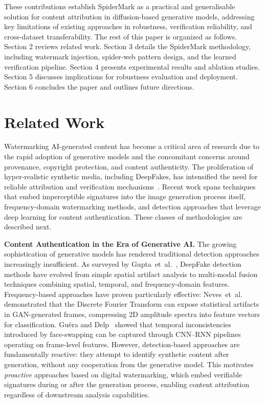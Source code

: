 \documentclass[lettersize,journal,review]{IEEEtran}
\begin{document}
These contributions establish SpiderMark as a practical and generalisable solution for content attribution in diffusion-based generative models, addressing key limitations of existing approaches in robustness, verification reliability, and cross-dataset transferability. The rest of this paper is organized as follows. Section 2 reviews related work. Section 3 details the SpiderMark methodology, including watermark injection, spider-web pattern design, and the learned verification pipeline. Section 4 presents experimental results and ablation studies. Section 5 discusses implications for robustness evaluation and deployment. Section 6 concludes the paper and outlines future directions. 

\section{Related Work}
\label{sec:rel_work}

Watermarking AI-generated content has become a critical area of research due to the rapid 
adoption of generative models and the concomitant concerns around provenance, copyright 
protection, and content authenticity. The proliferation of hyper-realistic synthetic media, 
including DeepFakes, has intensified the need for reliable attribution and verification 
mechanisms~\cite{gupta2024comprehensive, nguyen2022deep, verdoliva2020media}. 
Recent work spans techniques that embed imperceptible signatures into the image generation 
process itself, frequency-domain watermarking methods, and detection approaches that 
leverage deep learning for content authentication. These classes of methodologies are 
described next.

\noindent
\textbf{Content Authentication in the Era of Generative AI.}
The growing sophistication of generative models has rendered traditional detection 
approaches increasingly insufficient. As surveyed by Gupta~et~al.~\cite{gupta2024comprehensive}, 
DeepFake detection methods have evolved from simple spatial artifact analysis to 
multi-modal fusion techniques combining spatial, temporal, and frequency-domain 
features. Frequency-based approaches have proven particularly effective: 
Neves~et~al.~\cite{neves2020ganprintr} demonstrated that the Discrete Fourier 
Transform can expose statistical artifacts in GAN-generated frames, compressing 
2D amplitude spectra into feature vectors for classification. 
Gu{\"e}ra and Delp~\cite{guera2018deepfake} showed that temporal inconsistencies 
introduced by face-swapping can be captured through CNN--RNN pipelines operating 
on frame-level features.
However, detection-based approaches are fundamentally reactive: they attempt to identify 
synthetic content after generation, without any cooperation from the generative model. 
This motivates \emph{proactive} approaches based on digital watermarking, which embed 
verifiable signatures during or after the generation process, enabling content attribution 
regardless of downstream analysis capabilities.
\end{document}
